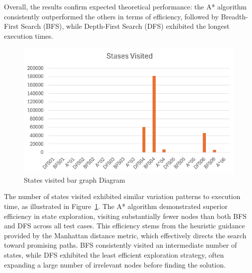 \documentclass[journal]{./IEEE/IEEEtran}
\begin{document}
Overall, the results confirm expected theoretical performance: the A* algorithm consistently outperformed the others in terms of efficiency, followed by Breadth-First Search (BFS), while Depth-First Search (DFS) exhibited the longest execution times.  

\begin{figure}[H]
    \centering
    \includegraphics[width=1\linewidth]{pictures-Clarence/stases visited bar graph.png}
    \caption{States visited bar graph Diagram}
    \label{fig:stases_visited_bar_graph}
\end{figure}
The number of states visited exhibited similar variation patterns to execution time, as illustrated in Figure~\ref{fig:stases_visited_bar_graph}. The A* algorithm demonstrated superior efficiency in state exploration, visiting substantially fewer nodes than both BFS and DFS across all test cases. This efficiency stems from the heuristic guidance provided by the Manhattan distance metric, which effectively directs the search toward promising paths. BFS consistently visited an intermediate number of states, while DFS exhibited the least efficient exploration strategy, often expanding a large number of irrelevant nodes before finding the solution.
\end{document}

